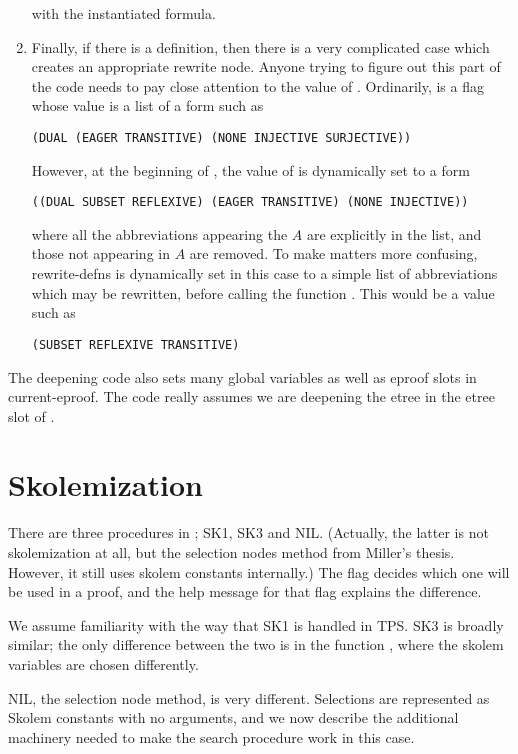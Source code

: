 \begin{enumerate}
with the instantiated formula.
\item Finally, if there is a definition, then there is a very complicated
case which creates an appropriate rewrite node.  Anyone trying to figure out
this part of the code needs to pay close attention to the value of
.  Ordinarily,  is a flag
whose value is a list of a form such as 
\begin{verbatim}
(DUAL (EAGER TRANSITIVE) (NONE INJECTIVE SURJECTIVE))
\end{verbatim}
However, at the beginning of ,
the value of  is dynamically set to
a form
\begin{verbatim}
((DUAL SUBSET REFLEXIVE) (EAGER TRANSITIVE) (NONE INJECTIVE))
\end{verbatim}
where all the abbreviations appearing the $A$ are explicitly in the list,
and those not appearing in $A$ are removed.
To make matters more confusing, rewrite-defns is dynamically set in this
case to a simple list of abbreviations which may be rewritten, before
calling the function .  This would be a value
such as
\begin{verbatim}
(SUBSET REFLEXIVE TRANSITIVE)
\end{verbatim}
\end{enumerate}
The deepening code also sets many global variables as well as eproof slots
in current-eproof.  The code really assumes we are deepening the etree
in the etree slot of .

\section{Skolemization}

There are three  procedures in \TPS; SK1, SK3 and NIL.
(Actually, the latter is not skolemization at all, but the selection nodes method from Miller's thesis. 
However, it still uses skolem constants internally.) 
The flag  decides which one will be used in a proof, and
the help message for that flag explains the difference.

We assume familiarity with the way that SK1 is handled in TPS. SK3 is broadly 
similar; the only difference between the two is in the function , where
the skolem variables are chosen differently.

NIL, the selection node method, is very different. Selections are represented as Skolem
constants with no arguments, and we now describe the additional machinery needed to make the search 
procedure work in this case.

